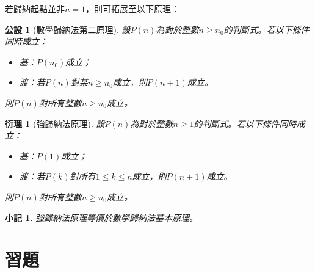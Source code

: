 \documentclass[12pt]{article}
\newtheorem*{corollary}{衍理}
\newtheorem*{remark}{小記}
\newtheorem*{axiom}{公設}
\begin{document}
    若歸納起點並非$n=1$，則可拓展至以下原理：

    \begin{axiom}[數學歸納法第二原理]
        設$P(n)$為對於整數$n\geq n_0$的判斷式。若以下條件同時成立：\begin{itemize}
            \item 基：$P(n_0)$成立；
            \item 渡：若$P(n)$對某$n\geq n_0$成立，則$P(n+1)$成立。
        \end{itemize}
        則$P(n)$對所有整數$n\geq n_0$成立。
    \end{axiom}

    \begin{corollary}[強歸納法原理]
        設$P(n)$為對於整數$n\geq 1$的判斷式。若以下條件同時成立：\begin{itemize}
            \item 基：$P(1)$成立；
            \item 渡：若$P(k)$對所有$1\leq k\leq n$成立，則$P(n+1)$成立。
        \end{itemize}
        則$P(n)$對所有整數$n\geq n_0$成立。
    \end{corollary}

    \begin{remark}
        強歸納法原理等價於數學歸納法基本原理。
    \end{remark}

    \section*{習題}
\end{document}
